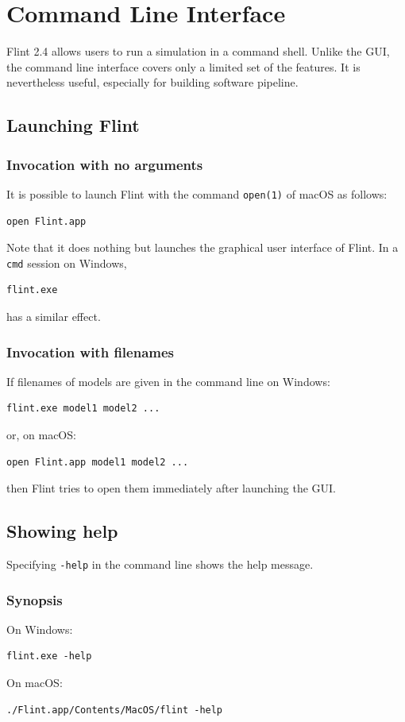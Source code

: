 \documentclass[a4paper,10pt]{report}
\begin{document}
\chapter{Command Line Interface}
\label{sec:org2c5a7a8}
Flint 2.4 allows users to run a simulation in a command shell.
Unlike the GUI, the command line interface covers only a limited set of
the features. It is nevertheless useful, especially for building software pipeline.

\section{Launching Flint}
\label{sec:org1c86123}

\subsection{Invocation with no arguments}
\label{sec:orgd9567b8}
It is possible to launch Flint with the command \texttt{open(1)} of macOS as follows:
\begin{verbatim}
open Flint.app
\end{verbatim}
Note that it does nothing but launches the graphical user interface of Flint.
In a \texttt{cmd} session on Windows,
\begin{verbatim}
flint.exe
\end{verbatim}
has a similar effect.

\subsection{Invocation with filenames}
\label{sec:org8d5a150}
If filenames of models are given in the command line on Windows:
\begin{verbatim}
flint.exe model1 model2 ...
\end{verbatim}
or, on macOS:
\begin{verbatim}
open Flint.app model1 model2 ...
\end{verbatim}
then Flint tries to open them immediately after launching the GUI.

\section{Showing help}
\label{sec:orgb8cddae}
Specifying \texttt{-help} in the command line shows the help message.

\subsection{Synopsis}
\label{sec:org42e2e74}
On Windows:
\begin{verbatim}
flint.exe -help
\end{verbatim}
On macOS:
\begin{verbatim}
./Flint.app/Contents/MacOS/flint -help
\end{verbatim}
\end{document}
